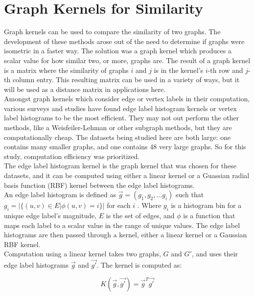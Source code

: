 %
%
%

\section{Graph Kernels for Similarity}

Graph kernels can be used to compare the similarity of two graphs. The development of these methods arose out of the need to determine if graphs were isometric in a faster way. The solution was a graph kernel which produces a scalar value for how similar two, or more, graphs are. The result of a graph kernel is a matrix where the similarity of graphs $i$ and $j$ is in the kernel's $i$-th row and $j$-th column entry. This resulting matrix can be used in a variety of ways, but it will be used as a distance matrix in applications here. \\

Amongst graph kernels which consider edge or vertex labels in their computation, various surveys and studies have found edge label histogram kernels or vertex label histograms to be the most efficient. They may not out perform the other methods, like a Weisfeiler-Lehman or other subgraph methods, but they are computationally cheap. The datasets being studied here are both large: one contains many smaller graphs, and one contains 48 very large graphs. So for this study, computation efficiency was prioritized. \\

The edge label histogram kernel is the graph kernel that was chosen for these datasets, and it can be computed using either a linear kernel or a Guassian radial basis function (RBF) kernel between the edge label histograms. \\
An edge label histogram is defined as $\vec{g} = (g_1,g_2, ... g_i)$ such that $g_i = | \{ (u,v) \in E | \phi(u,v) = i \} |$ for each $i$ \cite{sugiyama2015halting}. Where $g_i$ is a histogram bin for a unique edge label's magnitude, $E$ is the set of edges, and $\phi$ is a function that maps each label to a scalar value in the range of unique values. The edge label histograms are then passed through a kernel, either a linear kernel or a Gaussian RBF kernel.\\
Computation using a linear kernel takes two graphs, $G$ and $G'$, and uses their edge label histograms $\vec{g}$ and $\vec{g'}$. The kernel is computed as:

$$K(\vec{g},\vec{g'}) = \vec{g}^{T}\vec{g'} $$


